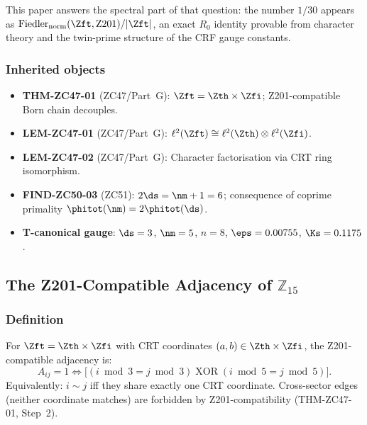 \documentclass[12pt, a4paper]{article}
\begin{document}
This paper answers the spectral part of that question:
the number $1/30$ appears as
$\text{Fiedler}_{\rm norm}(\Zft,\text{Z201})/|\Zft|$,
an exact $R_0$ identity provable from character theory
and the twin-prime structure of the CRF gauge constants.

\subsubsection{Inherited objects}

\begin{itemize}[leftmargin=2em, noitemsep]
\item \textbf{THM-ZC47-01} (ZC47/Part~G): $\Zft = \Zth\times\Zfi$;
  Z201-compatible Born chain decouples.
\item \textbf{LEM-ZC47-01} (ZC47/Part~G):
  $\ell^2(\Zft)\cong\ell^2(\Zth)\otimes\ell^2(\Zfi)$.
\item \textbf{LEM-ZC47-02} (ZC47/Part~G): Character factorisation
  via CRT ring isomorphism.
\item \textbf{FIND-ZC50-03} (ZC51): $2\ds = \nm+1 = 6$; consequence
  of coprime primality $\phitot(\nm)=2\phitot(\ds)$.
\item \textbf{T-canonical gauge}: $\ds=3$, $\nm=5$, $n=8$,
  $\eps=0.00755$, $\Ks=0.1175$.
\end{itemize}

\subsection{The Z201-Compatible Adjacency of $\mathbb{Z}_{15}$}

\subsubsection{Definition}

\begin{formalbox}[title={Z201-Compatible Adjacency (from THM-ZC47-01)}]
For $\Zft = \Zth\times\Zfi$ with CRT coordinates
$(a,b)\in\Zth\times\Zfi$, the Z201-compatible adjacency is:
\[
  A_{ij} = 1 \iff
  \bigl[(i\bmod 3 = j\bmod 3)\;\text{XOR}\;
        (i\bmod 5 = j\bmod 5)\bigr].
\]
Equivalently: $i\sim j$ iff they share exactly one CRT coordinate.
Cross-sector edges (neither coordinate matches) are forbidden
by Z201-compatibility (THM-ZC47-01, Step~2).
\end{formalbox}
\end{document}
